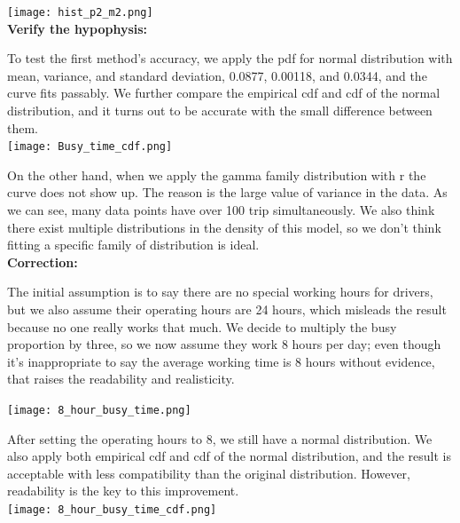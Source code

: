 \documentclass[11pt]{article}
\begin{document}
\noindent\texttt{[image: hist\_p2\_m2.png]}\\

\noindent\textbf{Verify the hypophysis:}\\
\par
To test the first method's accuracy, we apply the pdf for normal distribution with mean, variance, and standard deviation,
0.0877, 0.00118, and 0.0344, and the curve fits passably. We further compare the empirical cdf and cdf of the normal distribution,
and it turns out to be accurate with the small difference between them. \\

\noindent\texttt{[image: Busy\_time\_cdf.png]}\\
\par
On the other hand, when we apply the gamma family distribution with r  the curve does not show up. The reason is the large value of variance
in the data. As we can see, many data points have over 100%
trip simultaneously. We also think there exist multiple distributions in the density of this model, so we don’t think fitting a specific family
of distribution is ideal. \\

\noindent\textbf{Correction:}\\
\par
The initial assumption is to say there are no special working hours for drivers, but we also assume their operating hours are 24 hours,
which misleads the result because no one really works that much. We decide to multiply the busy proportion by three, so we now assume they
work 8 hours per day; even though it’s inappropriate to say the average working time is 8 hours without evidence, that raises the readability
and realisticity.

\noindent\texttt{[image: 8\_hour\_busy\_time.png]}\\
\par
After setting the operating hours to 8, we still have a normal distribution. We also apply both empirical cdf and cdf of the normal distribution,
and the result is acceptable with less compatibility than the original distribution. However, readability is the key to this improvement.\\

\noindent\texttt{[image: 8\_hour\_busy\_time\_cdf.png]}\\
\end{document}
